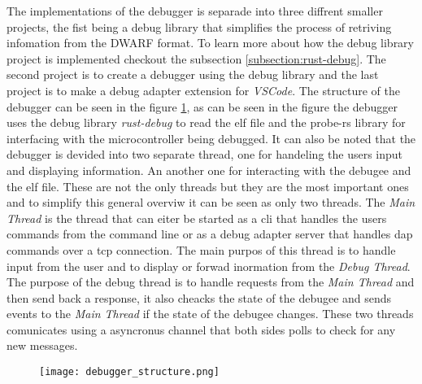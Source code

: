  

The implementations of the debugger is separade into three diffrent smaller projects, the fist being a debug library that simplifies the process of retriving infomation from the \gls{DWARF} format.
To learn more about how the debug library project is implemented checkout the subsection \ref{subsection:rust-debug}.
The second project is to create a debugger using the debug library and the last project is to make a debug adapter extension for \emph{VSCode}.
The structure of the debugger can be seen in the figure \ref{fig:EDBStruct}, as can be seen in the figure the debugger uses the debug library \emph{rust-debug} to read the \gls{elf} file and the probe-rs library for interfacing with the microcontroller being debugged.
It can also be noted that the debugger is devided into two separate thread, one for handeling the users input and displaying information.
An another one for interacting with the \gls{debugee} and the \gls{elf} file.
These are not the only threads but they are the most important ones and to simplify this general overviw it can be seen as only two threads.
The \emph{Main Thread} is the thread that can eiter be started as a cli that handles the users commands from the command line or as a debug adapter server that handles \acrshort{dap} commands over a \gls{tcp} connection.
The main purpos of this thread is to handle input from the user and to display or forwad inormation from the \emph{Debug Thread}.
The purpose of the debug thread is to handle requests from the \emph{Main Thread} and then send back a response, it also cheacks the state of the \gls{debugee} and sends events to the \emph{Main Thread} if the state of the debugee changes.
These two threads comunicates using a asyncronus channel that both sides polls to check for any new messages.


\begin{figure}[h]
    \centering
    \texttt{[image: debugger\_structure.png]}
    \label{fig:EDBStruct}
\end{figure}


